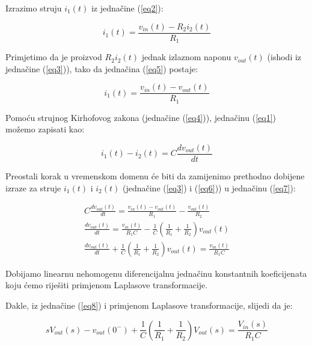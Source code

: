 \documentclass{article}
\begin{document}
    Izrazimo struju $i_1(t)$ iz jednačine (\ref{eq2}):

    \begin{equation}
        i_1(t) = \frac{v_{in}(t) - R_2i_2(t)}{R_1}\label{eq5}
    \end{equation}


    Primjetimo da je proizvod $R_2i_2(t)$ jednak izlaznom naponu $v_{out}(t)$ (ishodi iz jednačine
    (\ref{eq3})), tako da jednačina (\ref{eq5}) postaje:

    \begin{equation}
        i_1(t) = \frac{v_{in}(t) - v_{out}(t)}{R_1}\label{eq6}
    \end{equation}


    Pomoću strujnog Kirhofovog zakona (jednačine (\ref{eq4})), jednačinu (\ref{eq1}) možemo zapisati kao:

    \begin{equation}
        i_1(t) - i_2(t) = C\frac{dv_{out}(t)}{dt}\label{eq7}
    \end{equation}


    Preostali korak u vremenskom domenu će biti da zamijenimo prethodno dobijene izraze za struje
    $i_1(t)$ i $i_2(t)$ (jednačine (\ref{eq3}) i (\ref{eq6})) u jednačinu (\ref{eq7}):

    \begin{equation}
        \begin{split}
            C\frac{dv_{out}(t)}{dt} = \frac{v_{in}(t) - v_{out}(t)}{R_1} - \frac{v_{out}(t)}{R_2} \\
            \frac{dv_{out}(t)}{dt} = \frac{v_{in}(t)}{R_1C} - \frac{1}{C}(\frac{1}{R_1}+\frac{1}{R_2})v_{out}(t) \\
            \frac{dv_{out}(t)}{dt} + \frac{1}{C}(\frac{1}{R_1}+\frac{1}{R_2})v_{out}(t) = \frac{v_{in}(t)}{R_1C}
        \end{split}
        \label{eq8}
    \end{equation}


    Dobijamo linearnu nehomogenu diferencijalnu jednačinu konstantnih koeficijenata koju ćemo riješiti
    primjenom Laplasove transformacije.


    Dakle, iz jednačine (\ref{eq8}) i primjenom Laplasove transformacije, slijedi da je:

    \begin{equation}
        sV_{out}(s) - v_{out}(0^-) + \frac{1}{C}(\frac{1}{R_1}+\frac{1}{R_2})V_{out}(s) = \frac{V_{in}(s)}{R_1C}
        \label{eq9}
    \end{equation}
\end{document}
